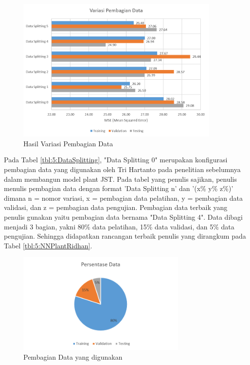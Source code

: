 \begin{figure}[!h]
	\centering
	\includegraphics[width=0.9\textwidth]{figures/DataSplittingResult}
	\caption{Hasil Variasi Pembagian Data}
	\label{fig:5:DataSplittingResult}
\end{figure}

Pada Tabel \ref{tbl:5:DataSplitting}, "Data Splitting 0" merupakan konfigurasi pembagian data yang digunakan oleh Tri Hartanto pada penelitian sebelumnya dalam membangun model plant JST. Pada tabel yang penulis sajikan, penulis menulis pembagian data dengan format 'Data Splitting n' dan '(x\% y\% z\%)' dimana n = nomor variasi, x = pembagian data pelatihan, y = pembagian data validasi, dan z = pembagian data pengujian. Pembagian data terbaik yang penulis gunakan yaitu pembagian data bernama "Data Splitting 4". Data dibagi menjadi 3 bagian, yakni 80\% data pelatihan, 15\% data validasi, dan 5\% data pengujian. Sehingga didapatkan rancangan terbaik penulis yang dirangkum pada Tabel \ref{tbl:5:NNPlantRidhan}.\\

\begin{figure}[!h]
	\centering
	\includegraphics[width=0.75\textwidth]{figures/DataSplittingFinal}
	\caption{Pembagian Data yang digunakan}
	\label{fig:5:DataSplittingFinal}
\end{figure}
\vspace{1em}

